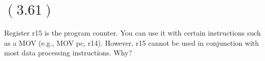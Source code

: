 \documentclass[letterpaper,12pt,titlepage]{article}
\begin{document}
\begin{mdframed}[style=MyFrame]
\end{mdframed}

\section*{$(3.61)$} Register r15 is the program counter. You can use it with certain instructions such as a MOV (e.g., MOV pc, r14). However, r15 cannot be used in conjunction with most data processing instructions. Why?

\begin{mdframed}[style=MyFrame]
\end{mdframed}



\end{document}
